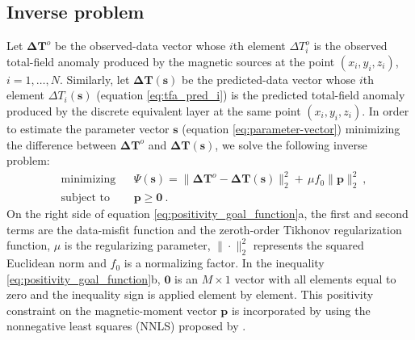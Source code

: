 \subsection{Inverse problem}

Let $\mathbf{\Delta T}^{o}$ be the observed-data vector whose $i$th element $\Delta T_{i}^{o}$
is the observed total-field anomaly produced by the magnetic sources at the point 
$(x_{i},y_{i},z_{i})$, $i = 1, \dots, N$. 
Similarly, let $\mathbf{\Delta T} (\mathbf{s})$ be the predicted-data vector whose $i$th element 
$\Delta T_{i}(\mathbf{s})$ (equation \ref{eq:tfa_pred_i}) is the predicted total-field anomaly  
produced by the discrete equivalent layer at the same point $(x_{i},y_{i},z_{i})$. 
In order to estimate the parameter vector $\mathbf{s}$ (equation \ref{eq:parameter-vector})
minimizing the difference between $\mathbf{\Delta T}^{o}$ and 
$\mathbf{\Delta T}(\mathbf{s})$, we solve the following inverse problem:
\begin{subequations}
	\begin{align}
	& \text{minimizing}
	& &\Psi(\mathbf{s}) =\lVert \mathbf{\Delta T}^{o} - \mathbf{\Delta T} (\mathbf{s}) 
	\rVert_{2}^{2} + \, \mu f_0 \parallel \mathbf{p} \parallel_{2}^{2} \: , \\
	& \text{subject to}
	& & \mathbf{p} \geqslant \mathbf{0} \: .
	\end{align}
	\label{eq:positivity_goal_function}
\end{subequations}
On the right side of equation \ref{eq:positivity_goal_function}a, the first and second terms are 
the data-misfit function and the zeroth-order Tikhonov regularization function, $\mu$ is the 
regularizing parameter, $\| \cdot \|_{2}^{2}$ represents the squared Euclidean norm and $f_0$ is a 
normalizing factor. In the inequality \ref{eq:positivity_goal_function}b, $\mathbf{0}$ is an 
$M \times 1$ vector with all elements equal to zero and the inequality sign is applied element 
by element. This positivity constraint on the magnetic-moment vector $\mathbf{p}$ 
is incorporated by using the nonnegative least squares (NNLS) proposed by 
\cite{lawson_hanson_1974}. 


